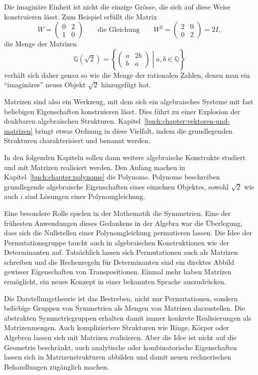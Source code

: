 Die imaginäre Einheit ist nicht die einzige Grösse, die sich auf diese
Weise konstruieren lässt.
Zum Beispiel erfüllt die Matrix
\[
W=\begin{pmatrix} 0&2\\1&0 \end{pmatrix}
\qquad\text{die Gleichung}\qquad
W^2 = \begin{pmatrix} 2&0\\0&2\end{pmatrix} = 2I,
\]
die Menge der Matrizen
\[
\mathbb{Q}(\!\sqrt{2})
=
\left\{\left.
\begin{pmatrix} a&2b\\ b&a\end{pmatrix}
\;\right|\;
a,b\in\mathbb{Q}
\right\}
\]
verhält sich daher genau so wie die Menge der rationalen Zahlen, denen
man ein ``imaginäres'' neues Objekt $\!\sqrt{2}$ hinzugefügt hat.

Matrizen sind also ein Werkzeug, mit dem sich ein algebraisches Systeme
mit fast beliebigen Eigenschaften konstruieren lässt.
Dies führt zu einer Explosion der denkbaren algebraischen Strukturen.
Kapitel~\ref{buch:chapter:vektoren-und-matrizen} bringt etwas Ordnung
in diese Vielfalt, indem die grundlegenden Strukturen charakterisiert
und benannt werden.

In den folgenden Kapiteln sollen dann weitere algebraische Konstrukte
studiert und mit Matrizen realisiert werden.
Den Anfang machen in Kapitel~\ref{buch:chapter:polynome} die Polynome.
Polynome beschreiben grundlegende algebraische Eigenschaften eines
einzelnen Objektes, sowohl $\sqrt{2}$ wie auch $i$ sind Lösungen einer
Polynomgleichung.

Eine besondere Rolle spielen in der Mathematik die Symmetrien.
Eine der frühesten Anwendungen dieses Gedankens in der Algebra war
die Überlegung, dass sich die Nullstellen einer Polynomgleichung
permutieren lassen.
Die Idee der Permutationsgruppe taucht auch in algebraischen Konstruktionen
wie der Determinanten auf.
Tatsächlich lassen sich Permutationen auch als Matrizen schreiben
und die Rechenregeln für Determinanten sind ein direktes Abbild
gewisser Eigenschaften von Transpositionen.
Einmal mehr haben Matrizen ermöglicht, ein neues Konzept in einer
bekannten Sprache auszudrücken.

Die Darstellungstheorie ist das Bestreben, nicht nur Permutationen,
sondern beliebige Gruppen von Symmetrien als Mengen von Matrizen
darzustellen.
Die abstrakten Symmetriegruppen erhalten damit immer konkrete 
Realisierungen als Matrizenmengen.
Auch kompliziertere Strukturen wie Ringe, Körper oder Algebren
lassen sich mit Matrizen realisieren.
Aber die Idee ist nicht auf die Geometrie beschränkt, auch analytische
oder kombinatorische Eigenschaften lassen sich in Matrizenstrukturen
abbilden und damit neuen rechnerischen Behandlungen zugänglich
machen.

